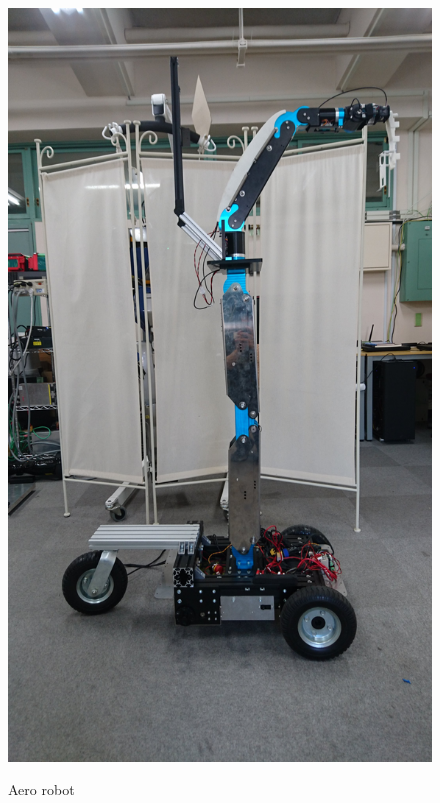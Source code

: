\documentclass{standalone}
\begin{document}
\begin{figure}[h]
{     \scriptsize{}\label{fig3:b}}{\includegraphics[width=\iwidth, height=\iheight]{sections/task2/images/aero-standup.jpg}}\hspace{1.1em}%
   \caption{Aero robot}
   \label{fig:aero}
 \end{figure}
\end{document}
